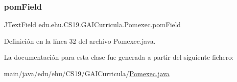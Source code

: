 \subsubsection{\texorpdfstring{pomField}{pomField}}
{\footnotesize\ttfamily J\+Text\+Field edu.\+ehu.\+C\+S19.\+G\+A\+I\+Curricula.\+Pomexec.\+pom\+Field\hspace{0.3cm}{\ttfamily [private]}}



Definición en la línea 32 del archivo Pomexec.\+java.



La documentación para esta clase fue generada a partir del siguiente fichero\+:\begin{DoxyCompactItemize}
\item 
main/java/edu/ehu/\+C\+S19/\+G\+A\+I\+Curricula/\mbox{\hyperlink{a00005}{Pomexec.\+java}}\end{DoxyCompactItemize}
